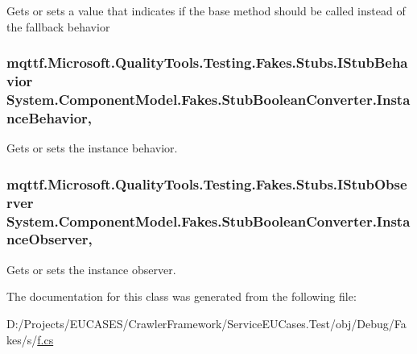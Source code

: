 Gets or sets a value that indicates if the base method should be called instead of the fallback behavior

\hypertarget{class_system_1_1_component_model_1_1_fakes_1_1_stub_boolean_converter_aa669bf9b894fa9c263eb838c771b92db}{
\subsubsection[{Instance\-Behavior}]{\setlength{\rightskip}{0pt plus 5cm}mqttf.\-Microsoft.\-Quality\-Tools.\-Testing.\-Fakes.\-Stubs.\-I\-Stub\-Behavior System.\-Component\-Model.\-Fakes.\-Stub\-Boolean\-Converter.\-Instance\-Behavior\hspace{0.3cm}{\ttfamily [get]}, {\ttfamily [set]}}}\label{class_system_1_1_component_model_1_1_fakes_1_1_stub_boolean_converter_aa669bf9b894fa9c263eb838c771b92db}


Gets or sets the instance behavior.

\hypertarget{class_system_1_1_component_model_1_1_fakes_1_1_stub_boolean_converter_a6fa250130a928bee9340aab21c005c31}{
\subsubsection[{Instance\-Observer}]{\setlength{\rightskip}{0pt plus 5cm}mqttf.\-Microsoft.\-Quality\-Tools.\-Testing.\-Fakes.\-Stubs.\-I\-Stub\-Observer System.\-Component\-Model.\-Fakes.\-Stub\-Boolean\-Converter.\-Instance\-Observer\hspace{0.3cm}{\ttfamily [get]}, {\ttfamily [set]}}}\label{class_system_1_1_component_model_1_1_fakes_1_1_stub_boolean_converter_a6fa250130a928bee9340aab21c005c31}


Gets or sets the instance observer.



The documentation for this class was generated from the following file\-:\begin{DoxyCompactItemize}
\item 
D\-:/\-Projects/\-E\-U\-C\-A\-S\-E\-S/\-Crawler\-Framework/\-Service\-E\-U\-Cases.\-Test/obj/\-Debug/\-Fakes/s/\hyperlink{s_2f_8cs}{f.\-cs}\end{DoxyCompactItemize}
